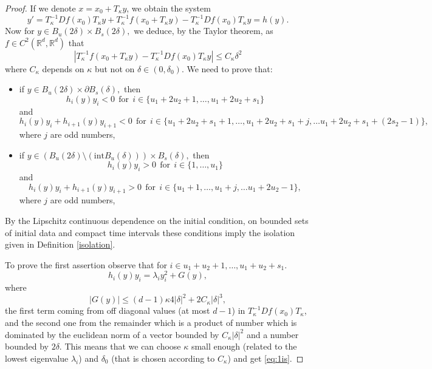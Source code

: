 \documentclass[11pt, leqno]{amsart}
\theoremstyle{definition}
\def\R{\mathbb{R}}
\begin{document}
\begin{proof}
 If we denote $x = x_0+T_\kappa y$, we obtain the system
 $$
 y' = T_\kappa^{-1}D f(x_0) T_\kappa y + T_\kappa^{-1} f(x_0 + T_\kappa y) - T_\kappa^{-1}D f(x_0) T_\kappa y = h(y).
 $$
 Now for
 $y\in  B_u(2\delta) \times B_s(2\delta),$ we deduce, by the Taylor theorem, as $f\in C^2(\R^d,\R^d)$ that
 $$
 |T_\kappa^{-1} f(x_0 + T_\kappa y) - T_\kappa^{-1}D f(x_0) T_\kappa y | \leq C_\kappa \delta^2
 $$\color{black}
 where $C_\kappa$ depends on $\kappa$ but not on $\delta \in (0,\delta_0)$.
We need to prove that:
\begin{itemize}
	\item if
	 $y\in  B_u(2\delta) \times \partial B_s(\delta),$
  then
	\begin{equation}\label{eq:1is}
	h_i(y) y_i < 0 \ \ \textrm{for} \ \ i\in \{u_1+2u_2+1,\ldots, u_1+2u_2+s_1\}
	\end{equation}
	and
		\begin{equation}\label{eq:2is}
	h_i(y) y_i + h_{i+1}(y)y_{i+1}< 0 \ \ \textrm{for} \ \ i\in \{u_1+2u_2+s_1+1,\ldots,u_1+2u_2+s_1+j,\ldots u_1+2u_2+s_1+(2s_2-1)\},
	\end{equation}
	where $j$ are odd numbers,
	\item if
	$y\in \left(B_u(2\delta) \setminus (\textrm{int} B_u(\delta))\right) \times B_s(\delta),$
	then
		\begin{equation}\label{eq:3is}
	h_i(y)y_i > 0 \ \ \textrm{for} \ \ i\in \{1,\ldots, u_1\}
	\end{equation}
	and
		\begin{equation}\label{eq:4is}
	h_i(y) y_i + h_{i+1}(y)y_{i+1}> 0 \ \ \textrm{for} \ \ i\in \{ u_1+1,\ldots,u_1+j,\ldots u_1+2u_2-1\},
	\end{equation}
	where $j$ are odd numbers,
\end{itemize}
By the Lipschitz continuous dependence on the initial condition, on bounded sets of initial data and compact time intervals these conditions imply the isolation given in Definition \ref{isolation}.

To prove the first assertion observe that for $i\in u_1+u_2+1,\ldots, u_1+u_2+s_1$.
$$
h_i(y)y_i = \lambda_i y_i^2 + G(y),
$$
where
$$
|G(y)| \leq (d-1)\kappa 4 |\delta|^2 + 2C_\kappa
|\delta|^3,
$$
the first term coming from off diagonal values (at most $d-1$) in $T_\kappa^{-1}D f(x_0) T_\kappa$, and the second one from the remainder which is a product of number which is dominated by the euclidean norm of a vector bounded by $C_\kappa |\delta|^2$ and a number bounded by $2\delta$. This means that we can choose $\kappa$ small enough (related to the lowest eigenvalue $\lambda_i$) and $\delta_0$ (that is chosen according to $C_\kappa$) and  get \eqref{eq:1is}.


\end{proof}
\end{document}
